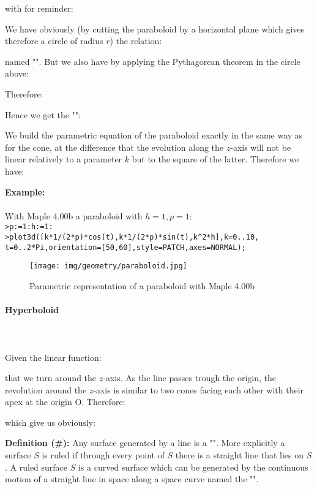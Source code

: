 {	with for reminder:
	
	We have obviously (by cutting the paraboloid by a horizontal plane which gives therefore a circle of radius $r$) the relation:
	
	named "". But we also have by applying the Pythagorean theorem in the circle above:
	
	Therefore:
	
	Hence we get the "":
	
	We build the parametric equation of the paraboloid exactly in the same way as for the cone, at the difference that the evolution along the $z$-axis will not be linear relatively to a parameter $k$ but to the square of the latter. Therefore we have:
	
	\begin{tcolorbox}[colframe=black,colback=white,sharp corners]
	\textbf{{\Large {}}Example:}\\\\
	With Maple 4.00b a paraboloid with $h=1,p=1$:\\

	\texttt{>p:=1:h:=1:\\
	>plot3d([k*1/(2*p)*cos(t),k*1/(2*p)*sin(t),k\string^2*h],k=0..10,\\
	t=0..2*Pi,orientation=[50,60],style=PATCH,axes=NORMAL); 
	}
	\begin{figure}[H]
		\centering
		\texttt{[image: img/geometry/paraboloid.jpg]}
		\caption{Parametric representation of a paraboloid with Maple 4.00b}
	\end{figure}
	\end{tcolorbox}
	
	\pagebreak
	\paragraph{Hyperboloid}\label{hyperboloid}\mbox{}\\\\
	Given the linear function:
	
	that we turn around the $z$-axis. As the line passes trough the origin, the revolution around the $z$-axis is similar to two cones facing each other with their apex at the origin O. Therefore:
	
	which give us obviously:
	
	\textbf{Definition (\#\mydef):} Any surface generated by a line is a "". More explicitly a surface $S$ is ruled if through every point of $S$ there is a straight line that lies on $S$. A ruled surface $S$ is a curved surface which can be generated by the continuous motion of a straight line in space along a space curve named the "".
	
}
